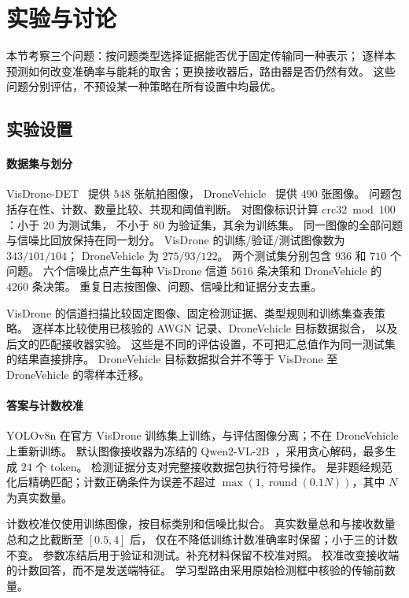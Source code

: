 \section{实验与讨论}\label{sec:exp}
本节考察三个问题：按问题类型选择证据能否优于固定传输同一种表示；
逐样本预测如何改变准确率与能耗的取舍；更换接收器后，路由器是否仍然有效。
这些问题分别评估，不预设某一种策略在所有设置中均最优。

\subsection{实验设置}\label{subsec:setup}
\paragraph{数据集与划分}
VisDrone-DET~\cite{zhu2021visdrone} 提供 $548$ 张航拍图像，
DroneVehicle~\cite{sun2022dronevehicle} 提供 $490$ 张图像。
问题包括存在性、计数、数量比较、共现和阈值判断。
对图像标识计算 $\mathrm{crc32}\bmod100$：小于 $20$ 为测试集，
不小于 $80$ 为验证集，其余为训练集。
同一图像的全部问题与信噪比回放保持在同一划分。
VisDrone 的训练/验证/测试图像数为 $343/101/104$；
DroneVehicle 为 $275/93/122$。
两个测试集分别包含 $936$ 和 $710$ 个问题。
六个信噪比点产生每种 VisDrone 信道 $5616$ 条决策和 DroneVehicle 的 $4260$ 条决策。
重复日志按图像、问题、信噪比和证据分支去重。

VisDrone 的信道扫描比较固定图像、固定检测证据、类型规则和训练集查表策略。
逐样本比较使用已核验的 AWGN 记录、DroneVehicle 目标数据拟合，
以及后文的匹配接收器实验。
这些是不同的评估设置，不可把汇总值作为同一测试集的结果直接排序。
DroneVehicle 目标数据拟合并不等于 VisDrone 至 DroneVehicle 的零样本迁移。

\paragraph{答案与计数校准}
YOLOv8n 在官方 VisDrone 训练集上训练，与评估图像分离；不在 DroneVehicle 上重新训练。
默认图像接收器为冻结的 Qwen2-VL-2B~\cite{wang2024qwen2vl}，采用贪心解码，最多生成 $24$ 个 token。
检测证据分支对完整接收数据包执行符号操作。
是非题经规范化后精确匹配；计数正确条件为误差不超过
$\max(1,\operatorname{round}(0.1N))$，其中 $N$ 为真实数量。

计数校准仅使用训练图像，按目标类别和信噪比拟合。
真实数量总和与接收数量总和之比截断至 $[0.5,4]$ 后，
仅在不降低训练计数准确率时保留；小于三的计数不变。
参数冻结后用于验证和测试。补充材料保留不校准对照。
校准改变接收端的计数回答，而不是发送端特征。
学习型路由采用原始检测框中核验的传输前数量。


